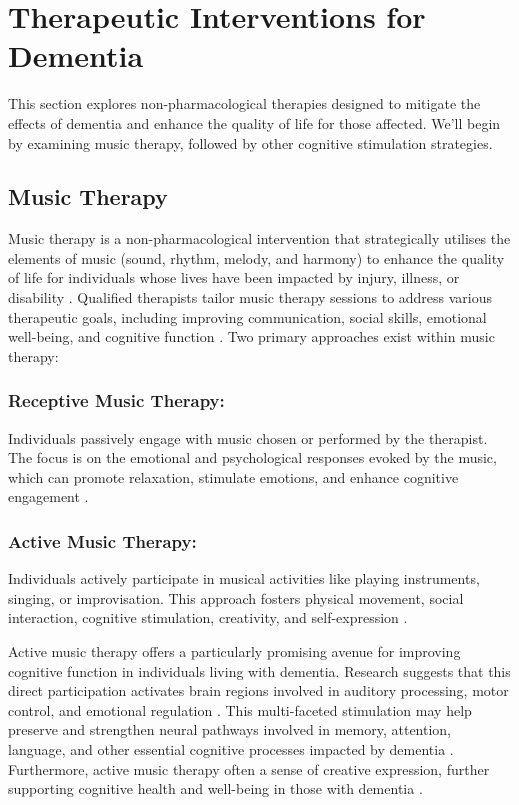 \documentclass{l4proj}
\begin{document}
\section{Therapeutic Interventions for Dementia}
This section explores non-pharmacological therapies designed to mitigate the effects of dementia and enhance the quality of life for those affected. We'll begin by examining music therapy, followed by other cognitive stimulation strategies.

\subsection{Music Therapy}\label{sec:music_therapy}

Music therapy is a non-pharmacological intervention that strategically utilises the elements of music (sound, rhythm, melody, and harmony) to enhance the quality of life for individuals whose lives have been impacted by injury, illness, or disability \citep{bleibel_effect_2023}. Qualified therapists tailor music therapy sessions to address various therapeutic goals, including improving communication, social skills, emotional well-being, and cognitive function \citep{vink_music_2004}. Two primary approaches exist within music therapy:

\subsubsection{Receptive Music Therapy:} Individuals passively engage with music chosen or performed by the therapist. The focus is on the emotional and psychological responses evoked by the music, which can promote relaxation, stimulate emotions, and enhance cognitive engagement \citep{vink_music_2004}.

\subsubsection{Active Music Therapy:} Individuals actively participate in musical activities like playing instruments, singing, or improvisation.  This approach fosters physical movement, social interaction, cognitive stimulation, creativity, and self-expression \citep{vink_music_2004}.

Active music therapy offers a particularly promising avenue for improving cognitive function in individuals living with dementia. Research suggests that this direct participation activates brain regions involved in auditory processing, motor control, and emotional regulation \citep{bleibel_effect_2023}. This multi-faceted stimulation may help preserve and strengthen neural pathways involved in memory, attention, language, and other essential cognitive processes impacted by dementia \citep{bleibel_effect_2023}.  Furthermore, active music therapy often a sense of creative expression, further supporting cognitive health and well-being in those with dementia \citep{bleibel_effect_2023}.
\end{document}
